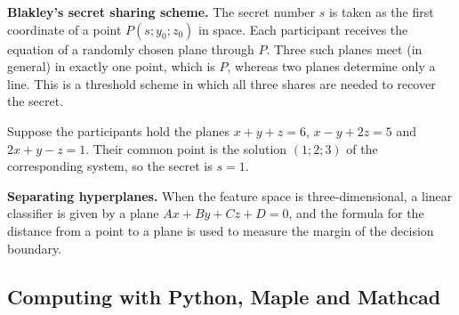 \textbf{Blakley’s secret sharing scheme.} The secret number $s$ is taken as the
first coordinate of a point $P(s;y_0;z_0)$ in space. Each participant receives
the equation of a randomly chosen plane through $P$. Three such planes meet (in
general) in exactly one point, which is $P$, whereas two planes determine only a
line. This is a threshold scheme in which all three shares are needed to
recover the secret.

\begin{misol}
Suppose the participants hold the planes
$x+y+z=6$, $x-y+2z=5$ and $2x+y-z=1$. Their common point is the solution
$(1;2;3)$ of the corresponding system, so the secret is $s=1$.
\end{misol}

\textbf{Separating hyperplanes.} When the feature space is three-dimensional,
a linear classifier is given by a plane $Ax+By+Cz+D=0$, and the formula for the
distance from a point to a plane is used to measure the margin of the decision
boundary.

\subsection{Computing with Python, Maple and Mathcad}

